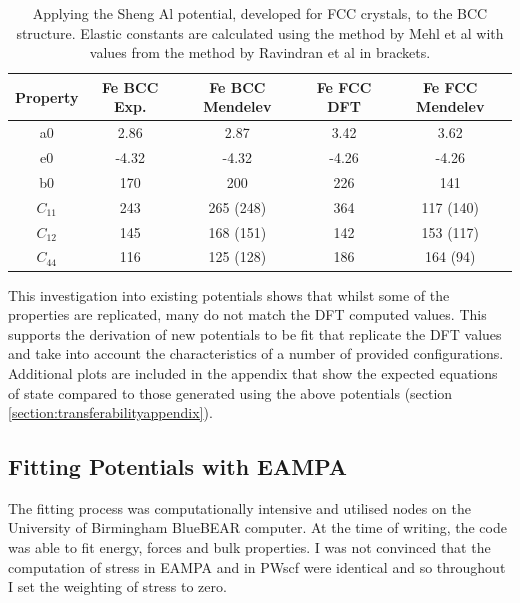 \begin{table}[h]
\begin{center}
\begin{tabular}{c c c c c}
\hline\hline
Property   & Fe BCC Exp. & Fe BCC Mendelev &  Fe FCC DFT & Fe FCC Mendelev \\
\hline\hline
a0             &   2.86  &   2.87      &   3.42   &   3.62          \\
e0             &  -4.32  &  -4.32      &  -4.26   &  -4.26          \\
b0             &   170  &    200       &  226     &   141            \\
$C_{11}$       &   243  &   265 (248)  &  364     &   117 (140)        \\
$C_{12}$       &   145  &   168 (151)  &  142     &   153 (117)      \\
$C_{44}$       &   116  &   125 (128)  &  186     &   164 (94)       \\
\hline\hline
\end{tabular}
\end{center}
\caption{Applying the Sheng Al potential, developed for FCC crystals, to the BCC structure.  Elastic constants are calculated using the method by Mehl et al with values from the method by Ravindran et al in brackets.}
\label{table:feacklandtransferability}
\end{table}

This investigation into existing potentials shows that whilst some of the properties are replicated, many do not match the DFT computed values.  This supports the derivation of new potentials to be fit that replicate the DFT values and take into account the characteristics of a number of provided configurations.  Additional plots are included in the appendix that show the expected equations of state compared to those generated using the above potentials (section \ref{section:transferabilityappendix}).




\subsection{Fitting Potentials with EAMPA}

The fitting process was computationally intensive and utilised nodes on the University of Birmingham BlueBEAR computer.  At the time of writing, the code was able to fit energy, forces and bulk properties.  I was not convinced that the computation of stress in EAMPA and in PWscf were identical and so throughout I set the weighting of stress to zero.

